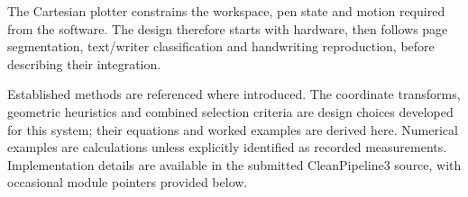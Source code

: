 \label{sec:design}
The Cartesian plotter constrains the workspace, pen state and motion required from the software. The design therefore starts with hardware, then follows page segmentation, text/writer classification and handwriting reproduction, before describing their integration.

Established methods are referenced where introduced. The coordinate transforms, geometric heuristics and combined selection criteria are design choices developed for this system; their equations and worked examples are derived here. Numerical examples are calculations unless explicitly identified as recorded measurements. Implementation details are available in the submitted CleanPipeline3 source, with occasional module pointers provided below.\par








